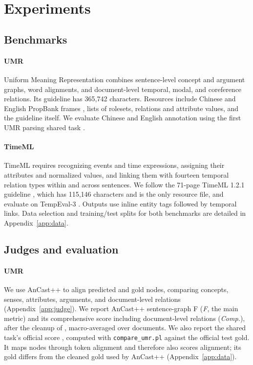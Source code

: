 \section{Experiments}
\label{sec:setup}

\subsection{Benchmarks}
\label{sec:benchmarks}

\paragraph{UMR} Uniform Meaning Representation \citep{vangysel2021designing,bonn2024building} combines sentence-level concept and argument graphs, word alignments, and document-level temporal, modal, and coreference relations. Its guideline has 365{,}742 characters. Resources include Chinese and English PropBank frames \citep{xue2009adding,palmer2005propbank}, lists of rolesets, relations and attribute values, and the guideline itself. We evaluate Chinese and English annotation using the first UMR parsing shared task \citep{stepanek2026first}.

\paragraph{TimeML} TimeML \citep{pustejovsky2003timeml} requires recognizing events and time expressions, assigning their attributes and normalized values, and linking them with fourteen temporal relation types within and across sentences. We follow the 71-page TimeML 1.2.1 guideline \citep{sauri2006timeml}, which has 115{,}146 characters and is the only resource file, and evaluate on TempEval-3 \citep{uzzaman2013semeval}. Outputs use inline entity tags followed by temporal links. Data selection and training/test splits for both benchmarks are detailed in Appendix~\ref{app:data}.

\subsection{Judges and evaluation}
\label{sec:evaluation}

\paragraph{UMR} We use AnCast++ \citep{sun2024anchor,sun2025ancastpp} to align predicted and gold nodes, comparing concepts, senses, attributes, arguments, and document-level relations (Appendix~\ref{app:judge}). We report AnCast++ sentence-graph F (\emph{F}, the main metric) and its comprehensive score including document-level relations (\emph{Comp.}), after the cleanup of \citet{chun2024pipeline}, macro-averaged over documents. We also report the shared task's official \jumach{} score \citep{stepanek2026first,zeman2026word}, computed with \texttt{compare\_umr.pl} against the official test gold. It maps nodes through token alignment and therefore also scores alignment; its gold differs from the cleaned gold used by AnCast++ (Appendix~\ref{app:data}).

